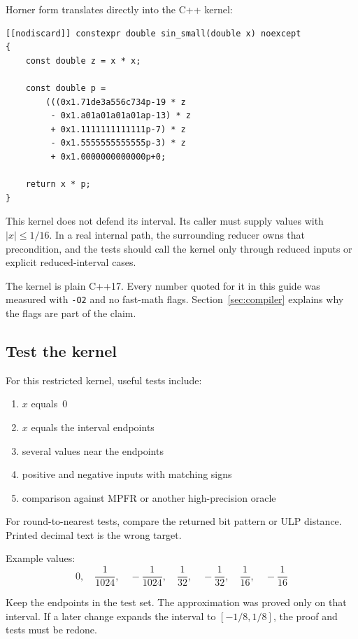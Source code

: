 \documentclass[manuscript, nonacm]{acmart}
\begin{document}
  Horner form translates directly into the C++ kernel:
  \begin{lstlisting}[style=cpp]
[[nodiscard]] constexpr double sin_small(double x) noexcept
{
    const double z = x * x;

    const double p =
        (((0x1.71de3a556c734p-19 * z
         - 0x1.a01a01a01a01ap-13) * z
         + 0x1.1111111111111p-7) * z
         - 0x1.5555555555555p-3) * z
         + 0x1.0000000000000p+0;

    return x * p;
}
  \end{lstlisting}

  This kernel does not defend its interval. Its caller must supply values with
  $|x| \le 1/16$. In a real internal path, the surrounding reducer owns that
  precondition, and the tests should call the kernel only through reduced
  inputs or explicit reduced-interval cases.

  The kernel is plain C++17. Every number quoted for it in this guide was
  measured with \texttt{-O2} and no fast-math flags.
  Section~\ref{sec:compiler} explains why the flags are part of the claim.

  \subsection{Test the kernel}

  For this restricted kernel, useful tests include:

  \begin{enumerate}
    \item $x$ equals~$0$
    \item $x$ equals the interval endpoints
    \item several values near the endpoints
    \item positive and negative inputs with matching signs
    \item comparison against MPFR or another high-precision oracle
  \end{enumerate}

  For round-to-nearest tests, compare the returned bit pattern or ULP distance.
  Printed decimal text is the wrong target.

  Example values:
  \[
    0,\quad \frac{1}{1024},\quad -\frac{1}{1024},\quad \frac{1}{32},\quad
    -\frac{1}{32},\quad \frac{1}{16},\quad -\frac{1}{16}
  \]

  Keep the endpoints in the test set. The approximation was proved only on that
  interval. If a later change expands the interval to $[-1/8,1/8]$, the proof
  and tests must be redone.
\end{document}
